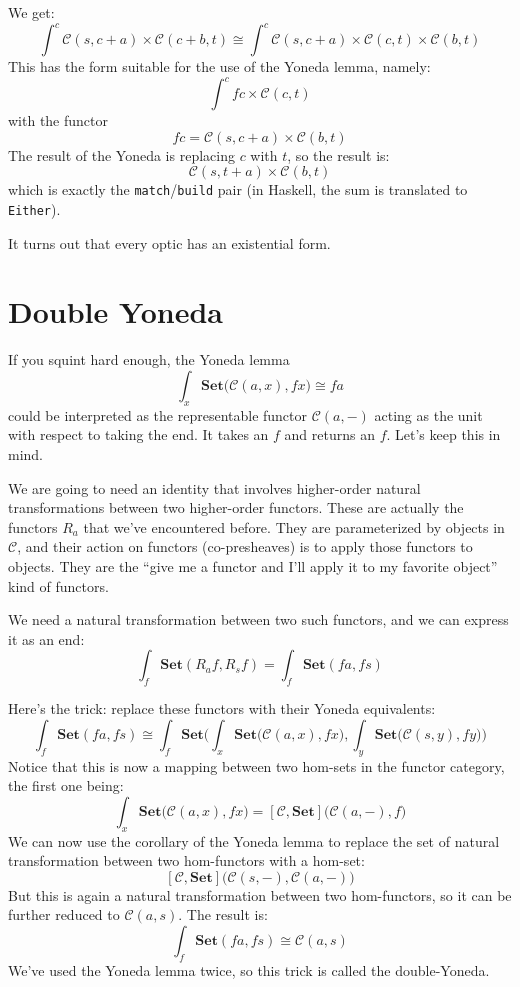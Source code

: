 \documentclass[11pt]{amsart}
\newcommand{\hask}[1]{\texttt{#1}}
\begin{document}
We get:
\[ \int^c \mathcal{C}(s, c + a) \times \mathcal{C}(c + b, t) \cong \int^c \mathcal{C}(s, c + a) \times \mathcal{C}(c, t)  \times \mathcal{C}(b, t)\]
This has the form suitable for the use of the Yoneda lemma, namely:
\[ \int^c f c \times \mathcal{C}(c, t) \]
with the functor
\[ f c = \mathcal{C}(s, c + a) \times \mathcal{C}(b, t) \]
The result of the Yoneda is replacing $c$ with $t$, so the result is:
\[ \mathcal{C}(s, t + a) \times \mathcal{C}(b, t)\]
which is exactly the \hask{match}/\hask{build} pair (in Haskell, the sum is translated to \hask{Either}).

It turns out that every optic has an existential form.

\section{Double Yoneda}

If you squint hard enough, the Yoneda lemma 
\[ \int_{x} \mathbf{Set}\big(\mathcal{C}(a, x), f x\big) \cong f a \]
could be interpreted as the representable functor $\mathcal{C}(a, -)$ acting as the unit with respect to taking the end. It takes an $f$ and returns an $f$. Let's keep this in mind.

We are going to need an identity that involves higher-order natural transformations between two higher-order functors. These are actually the functors $R_a$ that we've encountered before. They are parameterized by objects in $\mathcal{C}$, and their action on functors (co-presheaves) is to apply those functors to objects. They are the ``give me a functor and I'll apply it to my favorite object'' kind of functors. 

We need a natural transformation between two such functors, and we can express it as an end:
\[ \int_f  \mathbf{Set}( R_a f, R_s f) = \int_f  \mathbf{Set}( f a, f s) \]

Here's the trick: replace these functors with their Yoneda equivalents:
\[ \int_f  \mathbf{Set}( f a, f s) \cong \int_f  \mathbf{Set}\Big(\int_{x} \mathbf{Set}\big(\mathcal{C}(a, x), fx), \int_{y} \mathbf{Set}\big(\mathcal{C}(s, y), f y\big)\Big)\]
Notice that this is now a mapping between two hom-sets in the functor category, the first one being:
\[\int_{x} \mathbf{Set}\big(\mathcal{C}(a, x), fx\big) = [\mathcal{C}, \mathbf{Set}]\big(\mathcal{C}(a, -), f\big)\]
We can now use the corollary of the Yoneda lemma to replace the set of natural transformation between two hom-functors with a hom-set:
\[ [\mathcal{C}, \mathbf{Set}]\big(\mathcal{C}(s, -), \mathcal{C}(a, -) \big)\]
But this is again a natural transformation between two hom-functors, so it can be further reduced to $\mathcal{C}(a, s) $. The result is:
\[\int_f  \mathbf{Set}( f a, f s) \cong \mathcal{C}(a, s) \]
We've used the Yoneda lemma twice, so this trick is called the double-Yoneda.
\end{document}
